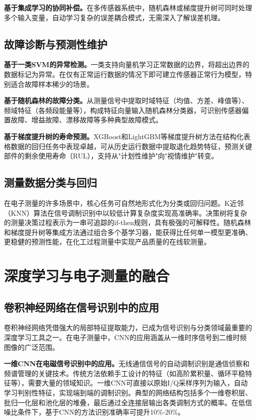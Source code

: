 \documentclass[12pt,a4paper]{article}
\numberwithin{figure}{section}
\numberwithin{table}{section}
\numberwithin{equation}{section}
\begin{document}
\textbf{基于集成学习的协同补偿。}在多传感器系统中，随机森林或梯度提升树可同时处理多个输入变量，自动学习复杂的误差耦合模式，无需深入了解误差机理。

\subsection{故障诊断与预测性维护}

\textbf{基于一类SVM的异常检测。}一类支持向量机学习正常数据的边界，将超出边界的数据标记为异常。在仅有正常运行数据的情况下即可建立传感器正常行为模型，特别适合故障样本稀少的场景。

\textbf{基于随机森林的故障分类。}从测量信号中提取时域特征（均值、方差、峰值等）、频域特征（各频段能量等），构成特征向量输入随机森林分类器，可识别传感器偏置故障、增益故障、漂移故障等多种典型故障模式。

\textbf{基于梯度提升树的寿命预测。}XGBoost和LightGBM等梯度提升树方法在结构化表格数据的回归任务中表现卓越，可从历史运行数据中提取退化趋势特征，预测关键部件的剩余使用寿命（RUL），支持从"计划性维护"向"视情维护"转变。

\subsection{测量数据分类与回归}

在电子测量的许多场景中，核心任务可自然地形式化为分类或回归问题。K近邻（KNN）算法在信号调制识别中以较低计算复杂度实现高准确率。决策树将复杂的测量决策过程表示为一串可追踪的if-then规则，具有极强的可解释性。随机森林和梯度提升树等集成方法通过组合多个基学习器，能获得比任何单一模型更准确、更稳健的预测性能，在化工过程测量中实现产品质量的在线软测量。

\newpage

\section{深度学习与电子测量的融合}

\subsection{卷积神经网络在信号识别中的应用}

卷积神经网络凭借强大的局部特征提取能力，已成为信号识别与分类领域最重要的深度学习工具之一。在电子测量中，CNN的应用涵盖从一维时序信号到二维时频图像的广泛范围。

\textbf{一维CNN在电磁信号识别中的应用。}无线通信信号的自动调制识别是通信侦察和频谱管理的关键技术。传统方法依赖手工设计的特征（如高阶累积量、循环平稳特征等），需要大量的领域知识。一维CNN可直接以原始I/Q采样序列为输入，自动学习判别性特征，实现端到端的调制识别。典型的网络结构包括多个一维卷积层、批归一化层和池化层的堆叠，最后通过全连接层输出各类调制方式的概率。在低信噪比条件下，基于CNN的方法识别准确率可提升10\%-20\%。
\end{document}
